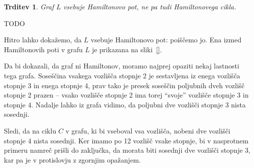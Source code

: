 \documentclass[12pt,a4paper]{amsart}
\theoremstyle{definition} %
\theoremstyle{plain} %
\newtheorem{trditev}[definicija]{Trditev}
\begin{document}
\bigskip

\begin{trditev}
    Graf $L$ vsebuje Hamiltonovo pot, ne pa tudi Hamiltonovega cikla.
\end{trditev}

\proof
    TODO
    
    Hitro lahko dokažemo, da $L$ vsebuje Hamiltonovo pot: poiščemo jo. Ena izmed Hamiltonovih poti v grafu $L$ je prikazana na sliki~\ref{}.
    
    Da bi dokazali, da graf ni Hamiltonov, moramo najprej opaziti nekaj lastnosti tega grafa. Soseščina vsakega vozlišča stopnje 2 je sestavljena iz enega vozlišča stopnje 3 in enega stopnje 4, prav tako je presek soseščin poljubnih dveh vozlišč stopnje 2 prazen -- vsako vozlišče stopnje 2 ima torej ``svoje'' vozlišče stopnje 3 in stopnje 4. Nadalje lahko iz grafa vidimo, da poljubni dve vozlišči stopnje 3 nista sosednji.
    
    Sledi, da na ciklu $C$ v grafu, ki bi vseboval vsa vozlišča, nobeni dve vozlišči stopnje 4 nista sosednji. Ker imamo po 12 vozlišč vsake stopnje, bi v nasprotnem primeru namreč prišli do zaključka, da morata biti sosednji dve vozlišči stopnje 3, kar pa je v protislovju z zgornjim opažanjem.
    
\end{document}
